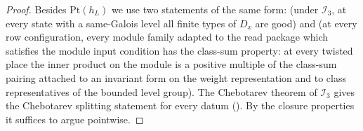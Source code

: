 \begin{proof}
Besides $\mathrm{Pt}(h_L)$ we use two statements of the same form:
 (under $\mathcal I_3$, at every state with a same-Galois
level all finite types of $D_x$ are good) and
 (at every row configuration, every module
family adapted to the read package which satisfies the module input condition has the class-sum
property: at every twisted place the inner product on the module is a positive multiple of the class-sum
pairing attached to an invariant form on the weight representation and to class representatives of the
bounded level group). The Chebotarev theorem of $\mathcal I_3$ gives the Chebotarev splitting statement for
every datum (). By the closure properties it suffices to
argue pointwise.


\end{proof}
